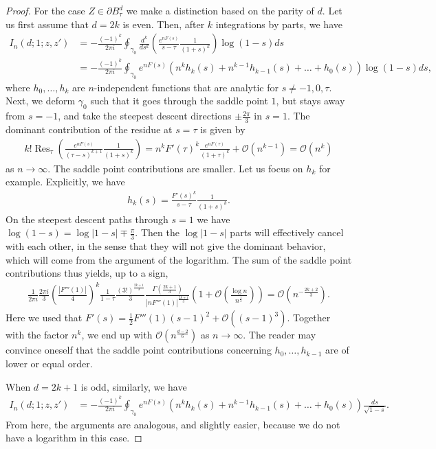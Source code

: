 \documentclass[%
 jmp,
cp,  %
 amsmath,amsthm,amssymb,%
 reprint,%
onecolumn]{revtex4-2}
\begin{document}
\begin{proof}
For the case $Z\in \partial B_\tau^d$ we make a distinction based on the parity of $d$. Let us first assume that $d=2k$ is even. Then, after $k$ integrations by parts, we have
\begin{align*}
I_n(d;1;z,z') &= -\frac{(-1)^k}{2\pi i} \oint_{\gamma_0} \frac{d^k}{ds^k} \left(\frac{e^{n F(s)}}{s-\tau} \frac{1}{(1+s)^k}\right) \log(1-s) ds\\
&= -\frac{(-1)^k}{2\pi i} \oint_{\gamma_0} e^{n F(s)} \left(n^k h_k(s) + n^{k-1} h_{k-1}(s) + \ldots + h_0(s) \right) \log(1-s) ds,
\end{align*}
where $h_0, \ldots, h_k$ are $n$-independent functions that are analytic for $s\neq -1,0,\tau$. Next, we deform $\gamma_0$ such that it goes through the saddle point $1$, but stays away from $s=-1$, and take the steepest descent directions $\pm \frac{2\pi}{3}$ in $s=1$. The dominant contribution of the residue at $s=\tau$ is given by
\begin{align*}
k! \operatorname{Res}_\tau\left(\frac{e^{n F(s)}}{(\tau-s)^{k+1}} \frac{1}{(1+s)^k}\right)
= n^k F'(\tau)^k \frac{e^{n F(\tau)}}{(1+\tau)^k}+ \mathcal O\left(n^{k-1}\right)
= \mathcal O\left(n^k\right)
\end{align*}
as $n\to\infty$. The saddle point contributions are smaller. Let us focus on $h_k$ for example. Explicitly, we have
\begin{align*}
h_k(s) = \frac{F'(s)^k}{s-\tau} \frac{1}{(1+s)^k}.
\end{align*}
On the steepest descent paths through $s=1$ we have $\log (1-s) = \log|1-s| \mp \frac{\pi}{3}$. Then the $\log |1-s|$ parts will effectively cancel with each other, in the sense that they will not give the dominant behavior, which will come from the argument of the logarithm. The sum of the saddle point contributions thus yields, up to a sign,
\begin{align*}
\frac{1}{2\pi i} \frac{2\pi i}{3} \left(\frac{|F'''(1)|}{4}\right)^k \frac{1}{1-\tau} \frac{(3!)^\frac{2k+1}{3}}{3} \frac{\Gamma\left(\frac{2k+1}{3}\right)}{|n F'''(1)|^\frac{2k+1}{3}} \left(1+ \mathcal O\left(\frac{\log n}{n^\frac{1}{3}}\right)\right)
= \mathcal O\left(n^{-\frac{2k+2}{3}}\right).
\end{align*}
Here we used that $F'(s) = \frac{1}{2} F'''(1) (s-1)^2 + \mathcal O((s-1)^3)$. Together with the factor $n^k$, we end up with $\mathcal O(n^{\frac{d-2}{6}})$ as $n\to\infty$. The reader may convince oneself that the saddle point contributions concerning $h_0, \ldots, h_{k-1}$ are of lower or equal order.  

When $d = 2k+1$ is odd, similarly, we have
\begin{align*}
I_n(d;1;z,z') &= -\frac{(-1)^k}{2\pi i} \oint_{\gamma_0} e^{n F(s)} \left(n^k h_k(s) + n^{k-1} h_{k-1}(s) + \ldots + h_0(s) \right) \frac{ds}{\sqrt{1-s}}. 
\end{align*}
From here, the arguments are analogous, and slightly easier, because we do not have a logarithm in this case. 
\end{proof}
\end{document}
